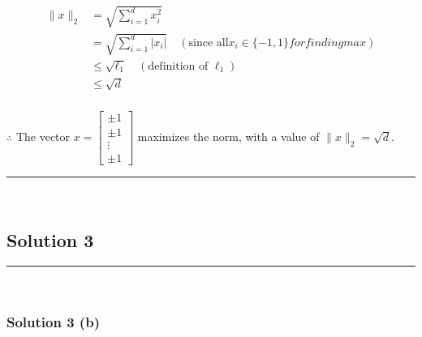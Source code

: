 \documentclass{article}
\begin{document}
\begin{align*}
    \|x\|_2 &= \sqrt{\sum_{i=1}^d x_i^2} \\
    &= \sqrt{\sum_{i=1}^d |x_i|} \quad (\text{since all} x_i \in \{-1,1\} for finding max) \\
    &\le \sqrt{\ell_1} \quad (\text{definition of  } \ell_1) \\
    &\le \sqrt{d} 
\end{align*}

\subsubsection*{\normalfont}{$\therefore$ The vector $x = \begin{bmatrix} \pm 1 \\ \pm 1 \\ \vdots \\ \pm 1 \end{bmatrix}$ maximizes the norm, with a value of $\|x\|_2 = \sqrt{d}$.}

\noindent\rule{\textwidth}{0.4pt}\\

\newpage

\subsection*{Solution 3}
\noindent\rule{\textwidth}{0.4pt}\\
\subsubsection*{Solution 3 (b)}
\end{document}
